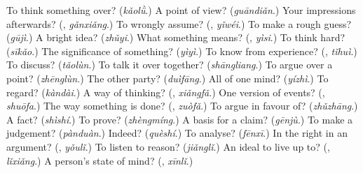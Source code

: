 \begin{tcolorbox}[breakable,colback=teal!4,colframe=teal!35!black,title={Before you move on}]
To think something over? (\emph{kǎolǜ}.) A point of view? (\emph{guāndiǎn}.) Your impressions afterwards? (\textbf{}, \emph{gǎnxiǎng}.) To wrongly assume? (\textbf{}, \emph{yǐwéi}.) To make a rough guess? (\emph{gūjì}.) A bright idea? (\emph{zhǔyi}.) What something means? (\textbf{}, \emph{yìsi}.) To think hard? (\emph{sīkǎo}.) The significance of something? (\emph{yìyì}.) To know from experience? (\textbf{}, \emph{tǐhuì}.) To discuss? (\emph{tǎolùn}.) To talk it over together? (\emph{shāngliang}.) To argue over a point? (\emph{zhēnglùn}.) The other party? (\emph{duìfāng}.) All of one mind? (\emph{yízhì}.) To regard? (\emph{kàndài}.) A way of thinking? (\textbf{}, \emph{xiǎngfǎ}.) One version of events? (\textbf{}, \emph{shuōfa}.) The way something is done? (\textbf{}, \emph{zuòfǎ}.) To argue in favour of? (\emph{zhǔzhāng}.) A fact? (\emph{shìshí}.) To prove? (\emph{zhèngmíng}.) A basis for a claim? (\emph{gēnjù}.) To make a judgement? (\emph{pànduàn}.) Indeed? (\emph{quèshí}.) To analyse? (\emph{fēnxī}.) In the right in an argument? (\textbf{}, \emph{yǒulǐ}.) To listen to reason? (\emph{jiǎnglǐ}.) An ideal to live up to? (\textbf{}, \emph{lǐxiǎng}.) A person's state of mind? (\textbf{}, \emph{xīnlǐ}.)
\end{tcolorbox}
